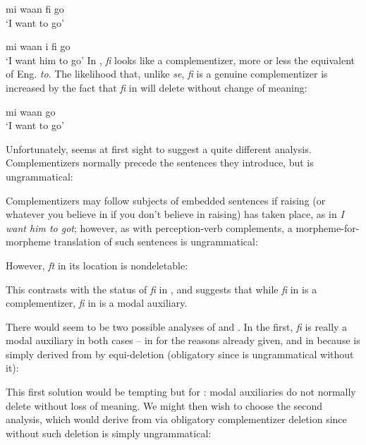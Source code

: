 \ea\label{ex:2:188}
mi waan fi go\\
\glt `I want to go'
\z

\ea\label{ex:2:189}
 mi waan i fi go\\
\glt `I want him to go'
\z
In , \textit{fi} looks like a complementizer, more or less the equivalent of Eng. \textit{to}. The likelihood that, unlike \textit{se}, \textit{fi} is a genuine complementizer is increased by the fact that \textit{fi} in  will delete without change of meaning:

\ea\label{ex:2:190}
 mi waan go \\
\glt `I want to go'
\z

Unfortunately,  seems at first sight to suggest a quite different analysis. Complementizers normally precede the sentences they introduce, but  is ungrammatical:

\z

Complementizers may follow subjects of embedded sentences if raising (or whatever you believe in if you don't believe in raising) has taken place, as in \textit{I want him to got}; however, as with perception-verb complements, a morpheme-for-morpheme translation of such sentences is ungrammatical:

\glt
\z

However, \textit{ft} in its  location is nondeletable:

\z
This contrasts with the status of \textit{fi} in , and suggests that while
\textit{fi} in  is a complementizer, \textit{fi} in  is a modal auxiliary.

There would seem to be two possible analyses of  and . In the first, \textit{fi} is really a modal auxiliary in both cases -- in  for the reasons already given, and in  because  is simply derived from  by equi-deletion (obligatory since  is ungrammatical without it):

\z

This first solution would be tempting but for : modal auxiliaries do not normally delete without loss of meaning. We might then wish to choose the second analysis, which would derive  from  via obligatory complementizer deletion since without such deletion  is simply ungrammatical:

